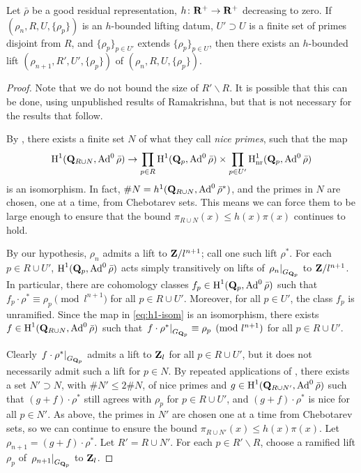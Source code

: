 \begin{theorem}\label{thm:lifting-datum}
Let $\bar\rho$ be a good residual representation, $h\colon \mathbf{R}^+ \to \mathbf{R}^+$ 
decreasing to zero. If $(\rho_n,R,U,\{\rho_p\})$ is an $h$-bounded lifting 
datum, $U'\supset U$ is a finite set of primes disjoint from $R$, and 
$\{\rho_p\}_{p\in U'}$ extends $\{\rho_p\}_{p\in U}$, then there exists an 
$h$-bounded lift $(\rho_{n+1},R',U',\{\rho_p\})$ of 
$(\rho_n,R,U,\{\rho_p\})$. 
\end{theorem}
\begin{proof}
Note that we do not bound the size of $R'\smallsetminus R$. It is possible that 
this can be done, using unpublished results of Ramakrishna, but that is not 
necessary for the results that follow. 

By \cite[Lem.~8]{khare-larsen-ramakrishna-2005}, there exists a finite set 
$N$ of what they call \emph{nice primes}, such that the map 
\begin{equation}\label{eq:h1-isom}
	\operatorname{H}^1(\mathbf{Q}_{R\cup N},\operatorname{Ad}^0\bar\rho) \to \prod_{p\in R} \operatorname{H}^1(\mathbf{Q}_p,\operatorname{Ad}^0\bar\rho) \times \prod_{p\in U'} \operatorname{H}_{\mathrm{nr}}^1(\mathbf{Q}_p,\operatorname{Ad}^0\bar\rho) 
\end{equation}
is an isomorphism. In fact, $\# N = h^1(\mathbf{Q}_{R\cup N},\operatorname{Ad}^0\bar\rho^\ast)$, and 
the primes in $N$ are chosen, one at a time, from Chebotarev sets. This means we 
can force them to be large enough to ensure that the bound 
$\pi_{R\cup N}(x) \leqslant h(x) \pi(x)$ continues to hold. 

By our hypothesis, $\rho_n$ admits a lift to $\mathbf{Z}/l^{n+1}$; call one such lift 
$\rho^\ast$. For each $p\in R\cup U'$, $\operatorname{H}^1(\mathbf{Q}_p,\operatorname{Ad}^0\bar\rho)$ acts simply 
transitively on lifts of $\left.\rho_n\right|_{G_{\mathbf{Q}_p}}$ to $\mathbf{Z}/l^{n+1}$. In 
particular, there are cohomology classes $f_p\in \operatorname{H}^1(\mathbf{Q}_p,\operatorname{Ad}^0\bar\rho)$ 
such that $f_p\cdot \rho^\ast \equiv \rho_p\pmod{l^{n+1}}$ for all 
$p\in R\cup U'$. Moreover, for all $p\in U'$, the class $f_p$ is unramified. 
Since the map in \eqref{eq:h1-isom} is an isomorphism, there exists 
$f\in \operatorname{H}^1(\mathbf{Q}_{R\cup N},\operatorname{Ad}^0\bar\rho)$ such that 
$\left.f\cdot \rho^\ast\right|_{G_{\mathbf{Q}_p}}\equiv \rho_p\pmod{l^{n+1}}$ for all 
$p\in R\cup U'$. 

Clearly $\left. f\cdot \rho^\ast\right|_{G_{\mathbf{Q}_p}}$ admits a lift to $\mathbf{Z}_l$ 
for all $p\in R\cup U'$, but it does not necessarily admit such a lift for 
$p\in N$. By repeated applications of \cite[Prop.~3.10]{pande-2011}, there 
exists a set $N'\supset N$, with $\# N'\leqslant 2\# N$, of nice primes and 
$g\in \operatorname{H}^1(\mathbf{Q}_{R\cup N'},\operatorname{Ad}^0\bar\rho)$ such that 
$(g+f)\cdot \rho^\ast$ still agrees with $\rho_p$ for $p\in R\cup U'$, and 
$(g+f)\cdot \rho^\ast$ is nice for all $p\in N'$. As above, the primes in $N'$ 
are chosen one at a time from Chebotarev sets, so we can continue to ensure the 
bound $\pi_{R\cup N'}(x)\leqslant h(x) \pi(x)$. Let 
$\rho_{n+1} = (g+f) \cdot \rho^\ast$. Let $R' = R\cup N'$. For each 
$p\in R'\smallsetminus R$, choose a ramified lift $\rho_p$ of 
$\left. \rho_{n+1}\right|_{G_{\mathbf{Q}_p}}$ to $\mathbf{Z}_l$. 


\end{proof}

